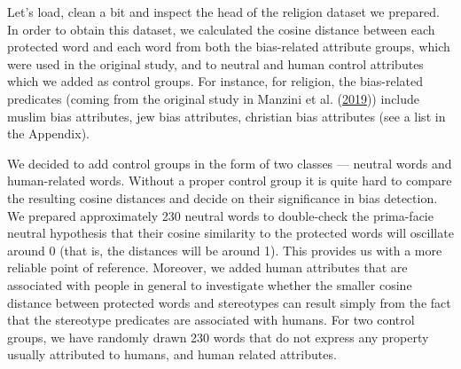\documentclass[12pt,]{book}
\begin{document}
Let's load, clean a bit and inspect the head of the religion dataset we
prepared. In order to obtain this dataset, we calculated the cosine
distance between each protected word and each word from both the
bias-related attribute groups, which were used in the original study,
and to neutral and human control attributes which we added as control
groups. For instance, for religion, the bias-related predicates (coming
from the original study in Manzini et al.
(\protect\hyperlink{ref-Manzini2019blackToCriminal}{2019})) include
muslim bias attributes, jew bias attributes, christian bias attributes
(see a list in the Appendix).

We decided to add control groups in the form of two classes --- neutral
words and human-related words. Without a proper control group it is
quite hard to compare the resulting cosine distances and decide on their
significance in bias detection. We prepared approximately 230 neutral
words to double-check the prima-facie neutral hypothesis that their
cosine similarity to the protected words will oscillate around 0 (that
is, the distances will be around 1). This provides us with a more
reliable point of reference. Moreover, we added human attributes that
are associated with people in general to investigate whether the smaller
cosine distance between protected words and stereotypes can result
simply from the fact that the stereotype predicates are associated with
humans. For two control groups, we have randomly drawn 230 words that do
not express any property usually attributed to humans, and human related
attributes.

\pagebreak  \vspace{1mm} \footnotesize

\begin{table}

\caption{\label{tab:religionTableHead}Head of the religion dataset.}
\centering
{}
\end{table}
\end{document}
